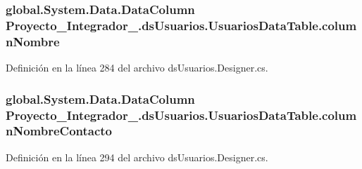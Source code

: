 \hypertarget{class_proyecto___integrador__3_1_1ds_usuarios_1_1_usuarios_data_table_a8bc5ddc1090c271f2438c39ff832cf6c}{
\subsubsection[{column\-Nombre}]{\setlength{\rightskip}{0pt plus 5cm}global.\-System.\-Data.\-Data\-Column Proyecto\-\_\-\-Integrador\-\_.\-ds\-Usuarios.\-Usuarios\-Data\-Table.\-column\-Nombre\hspace{0.3cm}{\ttfamily [private]}}}\label{class_proyecto___integrador__3_1_1ds_usuarios_1_1_usuarios_data_table_a8bc5ddc1090c271f2438c39ff832cf6c}


Definición en la línea 284 del archivo ds\-Usuarios.\-Designer.\-cs.

\hypertarget{class_proyecto___integrador__3_1_1ds_usuarios_1_1_usuarios_data_table_a16ac4bffb8b2cd014f1bbec318b3e275}{
\subsubsection[{column\-Nombre\-Contacto}]{\setlength{\rightskip}{0pt plus 5cm}global.\-System.\-Data.\-Data\-Column Proyecto\-\_\-\-Integrador\-\_.\-ds\-Usuarios.\-Usuarios\-Data\-Table.\-column\-Nombre\-Contacto\hspace{0.3cm}{\ttfamily [private]}}}\label{class_proyecto___integrador__3_1_1ds_usuarios_1_1_usuarios_data_table_a16ac4bffb8b2cd014f1bbec318b3e275}


Definición en la línea 294 del archivo ds\-Usuarios.\-Designer.\-cs.

